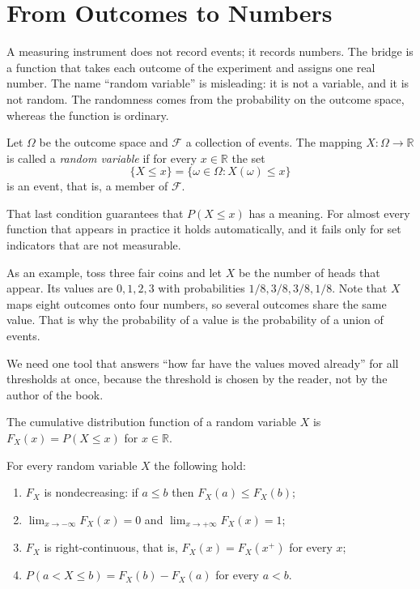 \section{From Outcomes to Numbers}

A measuring instrument does not record events; it records numbers. The bridge is a function
that takes each outcome of the experiment and assigns one real number. The name
``random variable'' is misleading: it is not a variable, and it is not random. The randomness
comes from the probability on the outcome space, whereas the function is ordinary.

\begin{definisi}
Let $\Omega$ be the outcome space and $\mathcal{F}$ a collection of events. The mapping
$X:\Omega\to\mathbb{R}$ is called a \emph{random variable} if for every $x\in\mathbb{R}$
the set
\[
\{X\le x\}=\{\omega\in\Omega : X(\omega)\le x\}
\]
is an event, that is, a member of $\mathcal{F}$.
\end{definisi}

That last condition guarantees that $P(X\le x)$ has a meaning. For almost every function that
appears in practice it holds automatically, and it fails only for set indicators that
are not measurable.

As an example, toss three fair coins and let $X$ be the number of heads that appear.
Its values are $0,1,2,3$ with probabilities $1/8,3/8,3/8,1/8$. Note that $X$ maps
eight outcomes onto four numbers, so several outcomes share the same value. That is
why the probability of a value is the probability of a union of events.

We need one tool that answers ``how far have the values moved already'' for all
thresholds at once, because the threshold is chosen by the reader, not by the author of the book.

\begin{definisi}
The cumulative distribution function of a random variable $X$ is
$F_X(x)=P(X\le x)$ for $x\in\mathbb{R}$.
\end{definisi}

\begin{proposisi}
For every random variable $X$ the following hold:
\begin{enumerate}
  \item $F_X$ is nondecreasing: if $a\le b$ then $F_X(a)\le F_X(b)$;
  \item $\lim_{x\to-\infty}F_X(x)=0$ and $\lim_{x\to+\infty}F_X(x)=1$;
  \item $F_X$ is right-continuous, that is, $F_X(x)=F_X(x^+)$ for every $x$;
  \item $P(a<X\le b)=F_X(b)-F_X(a)$ for every $a<b$.
\end{enumerate}
\end{proposisi}


